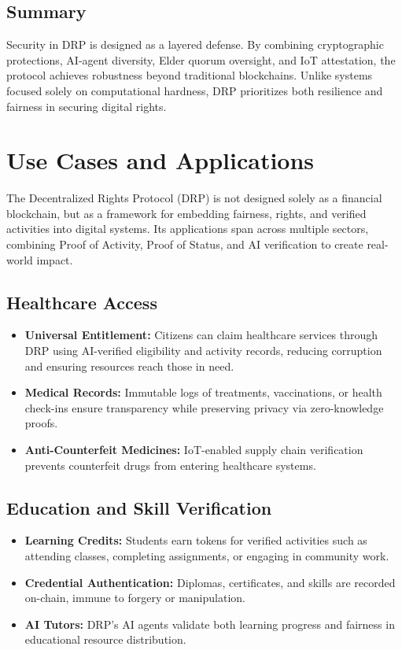 \documentclass[11pt,a4paper]{article}
\begin{document}
\subsection{Summary}
Security in DRP is designed as a layered defense. By combining cryptographic protections, AI-agent diversity, Elder quorum oversight, and IoT attestation, the protocol achieves robustness beyond traditional blockchains. Unlike systems focused solely on computational hardness, DRP prioritizes both resilience and fairness in securing digital rights.

\section{Use Cases and Applications}

The Decentralized Rights Protocol (DRP) is not designed solely as a financial blockchain, but as a framework for embedding fairness, rights, and verified activities into digital systems. Its applications span across multiple sectors, combining Proof of Activity, Proof of Status, and AI verification to create real-world impact.

\subsection{Healthcare Access}
\begin{itemize}
    \item \textbf{Universal Entitlement:} Citizens can claim healthcare services through DRP using AI-verified eligibility and activity records, reducing corruption and ensuring resources reach those in need.
    \item \textbf{Medical Records:} Immutable logs of treatments, vaccinations, or health check-ins ensure transparency while preserving privacy via zero-knowledge proofs.
    \item \textbf{Anti-Counterfeit Medicines:} IoT-enabled supply chain verification prevents counterfeit drugs from entering healthcare systems.
\end{itemize}

\subsection{Education and Skill Verification}
\begin{itemize}
    \item \textbf{Learning Credits:} Students earn tokens for verified activities such as attending classes, completing assignments, or engaging in community work.
    \item \textbf{Credential Authentication:} Diplomas, certificates, and skills are recorded on-chain, immune to forgery or manipulation.
    \item \textbf{AI Tutors:} DRP’s AI agents validate both learning progress and fairness in educational resource distribution.
\end{itemize}
\end{document}
